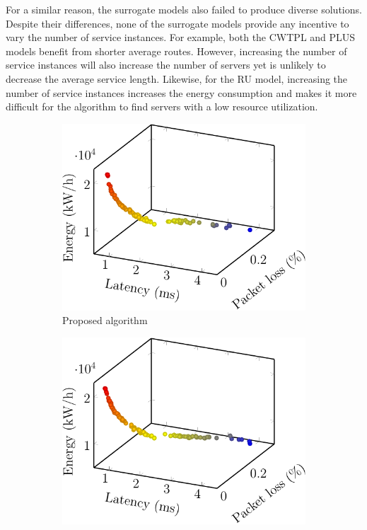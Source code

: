 For a similar reason, the surrogate models also failed to produce diverse solutions. Despite their differences, none of the surrogate models provide any incentive to vary the number of service instances. For example, both the CWTPL and PLUS models benefit from shorter average routes. However, increasing the number of service instances will also increase the number of servers yet is unlikely to decrease the average service length. Likewise, for the RU model, increasing the number of service instances increases the energy consumption and makes it more difficult for the algorithm to find servers with a low resource utilization.

\begin{figure}[t!]
    \centering

    \begin{subfigure}[b]{0.32\linewidth}
        \includegraphics[width=\textwidth]{graphs/model/proposed-crop}
        \caption{Proposed algorithm}
    \end{subfigure}
    \begin{subfigure}[b]{0.32\linewidth}
        \includegraphics[width=\textwidth]{graphs/model/mm1k-crop}

\end{subfigure}
\end{figure}
